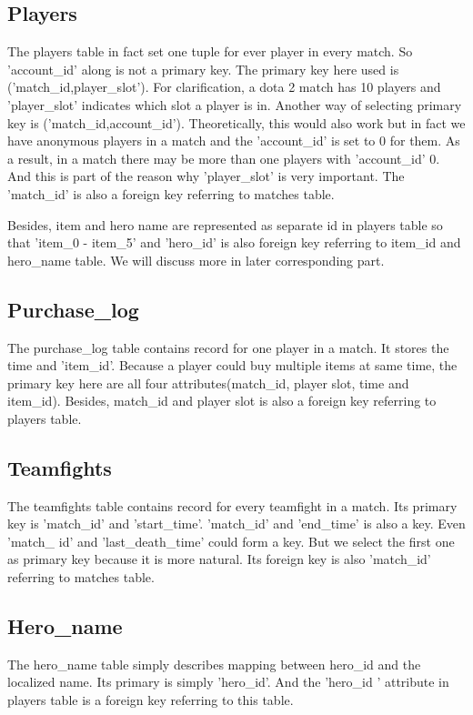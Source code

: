 \documentclass[a4paper]{article}
\begin{document}
\subsection{Players}
The players table in fact set one tuple for ever player in every match. So 'account\_id' along is not a primary key. The primary key here used is ('match\_id,player\_slot'). For clarification, a dota 2 match has 10 players and 'player\_slot' indicates which slot a player is in. Another way of selecting primary key is ('match\_id,account\_id'). Theoretically, this would also work but in fact we have anonymous players in a match and the 'account\_id' is set to 0 for them. As a result, in a match there may be more than one players with 'account\_id' 0. And this is part of the reason why 'player\_slot' is very important. The 'match\_id' is also a foreign key referring to matches table.\par
\noindent Besides, item and hero name are represented as separate id in players table so that 'item\_0 - item\_5' and 'hero\_id' is also foreign key referring to item\_id and hero\_name table. We will discuss more in later corresponding part.
\subsection{Purchase\_log}
The purchase\_log table contains record for one player in a match. It stores the time and 'item\_id'. Because a player could buy multiple items at same time, the primary key here are all four attributes(match\_id, player slot, time and item\_id). Besides, match\_id and player slot is also a foreign key referring to players table.

\subsection{Teamfights}
The teamfights table contains record for every teamfight in a match. Its primary key is 'match\_id' and 'start\_time'. 'match\_id' and 'end\_time' is also a key. Even 'match\_ id' and 'last\_death\_time' could form a key. But we select the first one as primary key because it is more natural. Its foreign key is also 'match\_id' referring to matches table.
\subsection{Hero\_name}
The hero\_name table simply describes mapping between hero\_id and the localized name. Its primary is simply 'hero\_id'. And the 'hero\_id ' attribute in players table is a foreign key referring to this table.
\end{document}
